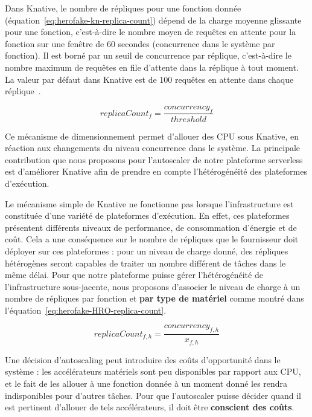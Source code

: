 Dans Knative, le nombre de répliques pour une fonction donnée (équation~\ref{eq:herofake-kn-replica-count}) dépend de la charge moyenne glissante pour une fonction, c'est-à-dire le nombre moyen de requêtes en attente pour la fonction sur une fenêtre de 60 secondes (concurrence dans le système par fonction). Il est borné par un seuil de concurrence par réplique, c'est-à-dire le nombre maximum de requêtes en file d'attente dans la réplique à tout moment. La valeur par défaut dans Knative est de 100 requêtes en attente dans chaque réplique~\cite{knative-autoscaling}.

\begin{equation}
    replicaCount_{f} = \frac{concurrency_{f}}{threshold}
\label{eq:herofake-kn-replica-count}
\end{equation}

Ce mécanisme de dimensionnement permet d'allouer des CPU sous Knative, en réaction aux changements du niveau concurrence dans le système. La principale contribution que nous proposons pour l'autoscaler de notre plateforme serverless est d'améliorer Knative afin de prendre en compte l'hétérogénéité des plateformes d'exécution.

Le mécanisme simple de Knative ne fonctionne pas lorsque l'infrastructure est constituée d'une variété de plateformes d'exécution. En effet, ces plateformes présentent différents niveaux de performance, de consommation d'énergie et de coût. Cela a une conséquence sur le nombre de répliques que le fournisseur doit déployer sur ces plateformes : pour un niveau de charge donné, des répliques hétérogènes seront capables de traiter un nombre différent de tâches dans le même délai. Pour que notre plateforme puisse gérer l'hétérogénéité de l'infrastructure sous-jacente, nous proposons d'associer le niveau de charge à un nombre de répliques par fonction et \textbf{par type de matériel} comme montré dans l'équation~\ref{eq:herofake-HRO-replica-count}.

\begin{equation}
    replicaCount_{f, h} = \frac{concurrency_{f, h}}{x_{f, h}}
\label{eq:herofake-HRO-replica-count}
\end{equation}

Une décision d'autoscaling peut introduire des coûts d'opportunité dans le système : les accélérateurs matériels sont peu disponibles par rapport aux CPU, et le fait de les allouer à une fonction donnée à un moment donné les rendra indisponibles pour d'autres tâches. Pour que l'autoscaler puisse décider quand il est pertinent d'allouer de tels accélérateurs, il doit être \textbf{conscient des coûts}.

